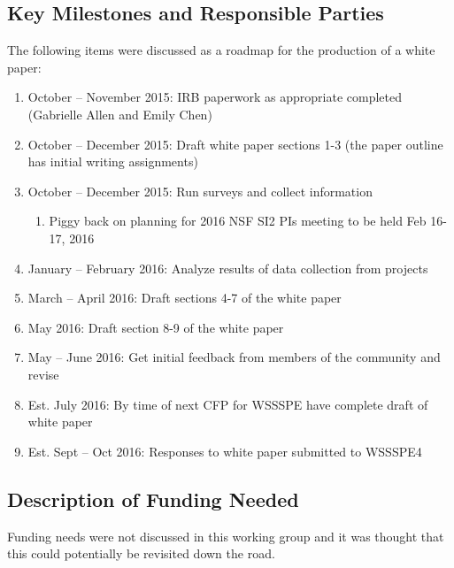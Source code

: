 \subsection{Key Milestones and Responsible Parties}

The following items were discussed as a roadmap for the production of a white paper:

\begin{enumerate}
\item
October – November 2015: IRB paperwork as appropriate completed (Gabrielle Allen and Emily Chen)

\item
October – December 2015: Draft white paper sections 1-3 (the paper outline has initial writing assignments)

\item
October – December 2015: Run surveys and collect information

\begin{enumerate}
\item
        Piggy back on planning for 2016 NSF SI2 PIs meeting to be held Feb 16-17, 2016
\end{enumerate}

\item
January – February 2016: Analyze results of data collection from projects

\item
March – April 2016: Draft sections 4-7 of the white paper

\item
May 2016: Draft section 8-9 of the white paper

\item
May – June 2016: Get initial feedback from members of the community and revise

\item
Est. July 2016: By time of next CFP for WSSSPE have complete draft of white paper

\item
Est. Sept – Oct 2016: Responses to white paper submitted to WSSSPE4

\end{enumerate}


\subsection{Description of Funding Needed}

Funding needs were not discussed in this working group and it was thought that this could potentially be revisited down the road.



